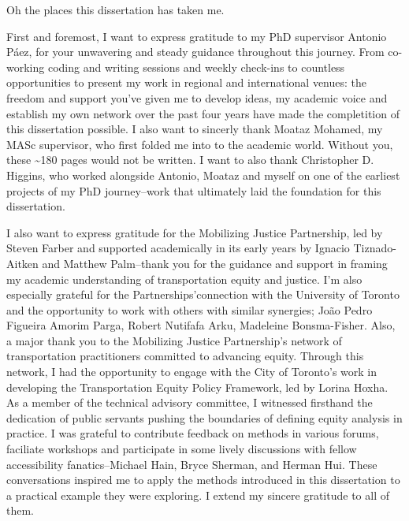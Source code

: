 \documentclass[
11pt, %
oneside, %
english, %
singlespacing, %
]{macthesis} %
\begin{document}
  \begin{acknowledgements}
  \addchaptertocentry{\acknowledgementname} %
    Oh the places this dissertation has taken me.

    First and foremost, I want to express gratitude to my PhD supervisor Antonio Páez, for your unwavering and steady guidance throughout this journey. From co-working coding and writing sessions and weekly check-ins to countless opportunities to present my work in regional and international venues: the freedom and support you've given me to develop ideas, my academic voice and establish my own network over the past four years have made the completition of this dissertation possible. I also want to sincerly thank Moataz Mohamed, my MASc supervisor, who first folded me into to the academic world. Without you, these \textasciitilde180 pages would not be written. I want to also thank Christopher D. Higgins, who worked alongside Antonio, Moataz and myself on one of the earliest projects of my PhD journey--work that ultimately laid the foundation for this dissertation.

    I also want to express gratitude for the Mobilizing Justice Partnership, led by Steven Farber and supported academically in its early years by Ignacio Tiznado-Aitken and Matthew Palm--thank you for the guidance and support in framing my academic understanding of transportation equity and justice. I'm also especially grateful for the Partnerships'connection with the University of Toronto and the opportunity to work with others with similar synergies; João Pedro Figueira Amorim Parga, Robert Nutifafa Arku, Madeleine Bonsma-Fisher. Also, a major thank you to the Mobilizing Justice Partnership's network of transportation practitioners committed to advancing equity. Through this network, I had the opportunity to engage with the City of Toronto's work in developing the Transportation Equity Policy Framework, led by Lorina Hoxha. As a member of the technical advisory committee, I witnessed firsthand the dedication of public servants pushing the boundaries of defining equity analysis in practice. I was grateful to contribute feedback on methods in various forums, faciliate workshops and participate in some lively discussions with fellow accessibility fanatics--Michael Hain, Bryce Sherman, and Herman Hui. These conversations inspired me to apply the methods introduced in this dissertation to a practical example they were exploring. I extend my sincere gratitude to all of them.


\end{acknowledgements}
\end{document}
